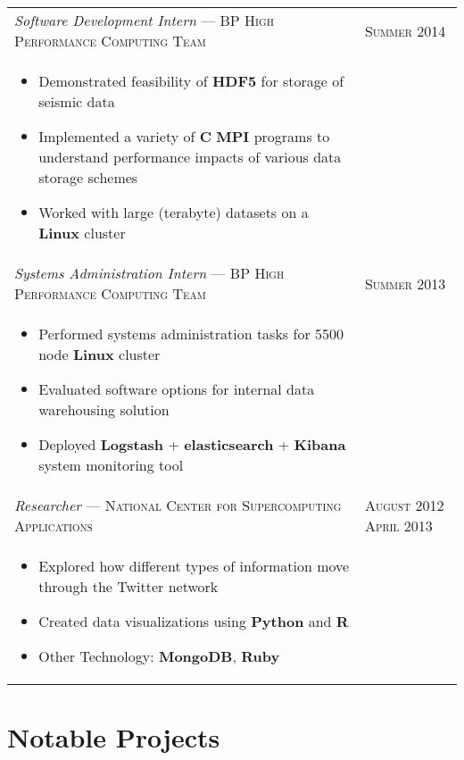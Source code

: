 \documentclass[letterpaper,10pt]{article}
\begin{document}
\begin{tabular}{p{13.5cm}>{\raggedleft\arraybackslash}p{2.5cm}}
    \emph{Software Development Intern} --- \textsc{BP High Performance Computing Team} &
    \textsc{Summer 2014} \\

    \vspace{-2mm}
    \begin{itemize}
        \item Demonstrated feasibility of \textbf{HDF5} for storage of seismic data
        \item Implemented a variety of \textbf{C} \textbf{MPI} programs to understand performance impacts of various data storage schemes
        \item Worked with large (terabyte) datasets on a \textbf{Linux} cluster
    \end{itemize} \\

    \emph{Systems Administration Intern} --- \textsc{BP High Performance Computing Team} &
    \textsc{Summer 2013} \\

    \vspace{-2mm}
    \begin{itemize}
        \item Performed systems administration tasks for 5500 node \textbf{Linux} cluster
        \item Evaluated software options for internal data warehousing solution
        \item Deployed \textbf{Logstash} + \textbf{elasticsearch} + \textbf{Kibana} system monitoring tool
    \end{itemize} \\

    \emph{Researcher} --- \textsc{National Center for Supercomputing Applications} &
    \textsc{August 2012 April 2013} \\

    \vspace{-6mm}
    \begin{itemize}
        \item Explored how different types of information move through the Twitter network
        \item Created data visualizations using \textbf{Python} and \textbf{R}
        \item Other Technology: \textbf{MongoDB}, \textbf{Ruby}
    \end{itemize}
\end{tabular}

\section{Notable Projects}
\end{document}
